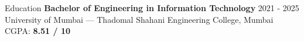 \documentclass{resume} %
\begin{document}



\begin{rSection}{Education}
    {\bf Bachelor of Engineering in Information Technology} \hfill {2021 - 2025 } \\
    University of Mumbai — Thadomal Shahani Engineering College, Mumbai  \hfill CGPA: {\bf 8.51 / 10}


\end{rSection}
\end{document}

